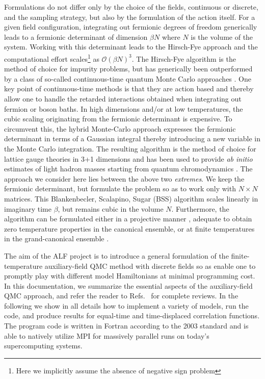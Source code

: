  Formulations do not differ  only  by the choice of the fields, continuous or discrete,  and the sampling strategy, but also by the  formulation of the action itself.
For a given field configuration, integrating out fermionic degrees of freedom generically leads to a fermionic determinant of dimension $\beta N$ where $N$ is the volume of the system.  Working  with this determinant leads to the  Hirsch-Fye approach \cite{HirschFye86}  and the computational effort scales\footnote{Here we implicitly assume the absence of negative sign problem} as $\mathcal{O}\left( \beta N \right)^3$. The Hirsch-Fye  algorithm is the method of choice for impurity problems, but has  generically been outperformed by a class of so-called continuous-time quantum Monte Carlo approaches  
\cite{Gull_rev,Assaad14_rev, Assaad07}.  One key point of continuous-time methods is that they are action based and thereby allow one to handle the retarded interactions obtained when integrating out fermion or boson baths.  In high dimensions and/or at low temperatures, the cubic scaling originating from the fermionic determinant is expensive. To circumvent this, the hybrid Monte-Carlo approach  \cite{Scalettar86,Duane87}  expresses the fermionic determinant in terms of a Gaussian integral thereby introducing a new variable in the Monte Carlo integration.    The resulting algorithm is the method of choice for lattice gauge theories in 3+1 dimensions   and has been used to provide \emph{ab initio} estimates of light hadron masses starting from quantum chromodynamics \cite{Durr08}.
The approach we consider here lies between the  above two  \emph{extremes}.  We keep the fermionic determinant, but formulate  the problem so as to  work only with $N\times N$ matrices.    This 
Blankenbecler,  Scalapino, Sugar (BSS)  algorithm scales linearly in  imaginary time $\beta$, but remains cubic in the volume $N$.    Furthermore, the algorithm can be formulated either in a projective manner \cite{Sugiyama86,Sorella89},  adequate to obtain zero temperature properties in the  canonical ensemble,  or at finite temperatures in the  grand-canonical ensemble \cite{White89}.

The aim of the ALF project is to introduce a general formulation of the finite-temperature auxiliary-field QMC method with discrete  fields so as enable one to promptly play with different model Hamiltonians  at  minimal programming cost. In this documentation, we summarize the essential aspects of the auxiliary-field QMC approach,   and refer the reader to Refs.~\cite{Assaad02,Assaad08_rev} for complete reviews.    
In the following we show in all details how to implement a variety of models, run the code, and produce results for  equal-time and time-displaced correlation functions. 
The program code is written in Fortran according to the 2003 standard and is able to natively utilize MPI for massively parallel runs on today's supercomputing systems.


